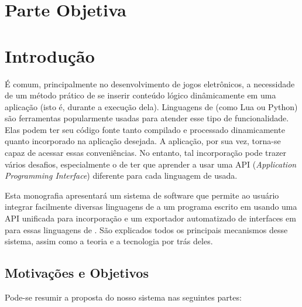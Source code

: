 \chapter*{Parte Objetiva}
\label{sec:parte_objetiva}
\chapter{Introdução}
\label{sec:intr}

É comum, principalmente no desenvolvimento de jogos eletrônicos, a necessidade
de um método prático de se inserir conteúdo lógico dinâmicamente em uma
aplicação (isto é, durante a execução dela). Linguagens de \script{} (como Lua ou
Python) são ferramentas popularmente usadas para atender esse tipo de
funcionalidade. Elas podem ter seu código fonte tanto compilado e processado
dinamicamente quanto incorporado na aplicação desejada. A aplicação, por sua
vez, torna-se capaz de acessar essas conveniências. No entanto, tal incorporação
pode trazer vários desafios, especialmente o de ter que aprender a usar uma API
(\textit{Application Programming Interface}) diferente para cada linguagem de
\script{} usada.

Esta monografia apresentará um sistema de software que permite ao usuário
integrar facilmente diversas linguagens de \script{} a um programa escrito em
\CXX{} usando uma API unificada para incorporação e um exportador
automatizado de interfaces em \CXX{} para essas linguagens de \script{}. São
explicados todos os principais mecanismos desse sistema, assim como a teoria e a
tecnologia por trás deles.

\section{Motivações e Objetivos}
\label{sec:intr:motivacoes_objetivos}

Pode-se resumir a proposta do nosso sistema nas seguintes partes:

